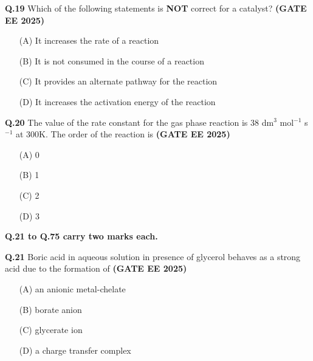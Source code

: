 \documentclass[journal,12pt,onecolumn]{exam}
\theoremstyle{remark}
\begin{document}
\noindent \textbf{Q.19} Which of the following statements is \textbf{NOT} correct for a catalyst? \hfill{\textbf{(GATE EE 2025)}}
\begin{multicols}{2}
\begin{itemize}[leftmargin=*,labelsep=1em]
    \item[(A)] It increases the rate of a reaction
    \item[(B)] It is not consumed in the course of a reaction
    \item[(C)] It provides an alternate pathway for the reaction
    \item[(D)] It increases the activation energy of the reaction
\end{itemize}
\end{multicols}
\vspace{0.5cm}

\noindent \textbf{Q.20} The value of the rate constant for the gas phase reaction  is 38 dm$^{3}$ mol$^{-1}$ s$^{-1}$ at 300K. The order of the reaction is \hfill{\textbf{(GATE EE 2025)}}
\begin{multicols}{2}
\begin{itemize}[leftmargin=*,labelsep=1em]
    \item[(A)] 0
    \item[(B)] 1
    \item[(C)] 2
    \item[(D)] 3
\end{itemize}
\end{multicols}
\vspace{0.5cm}

\noindent \textbf {Q.21 to Q.75 carry two marks each.}

\vspace{0.5cm}

\noindent \textbf{Q.21} Boric acid in aqueous solution in presence of glycerol behaves as a strong acid due to the formation of \hfill{\textbf{(GATE EE 2025)}}
\begin{multicols}{2}
\begin{itemize}[leftmargin=*,labelsep=1em]
    \item[(A)] an anionic metal-chelate
    \item[(B)] borate anion
    \item[(C)] glycerate ion
    \item[(D)] a charge transfer complex
\end{itemize}
\end{multicols}
\vspace{0.5cm}
\end{document}

